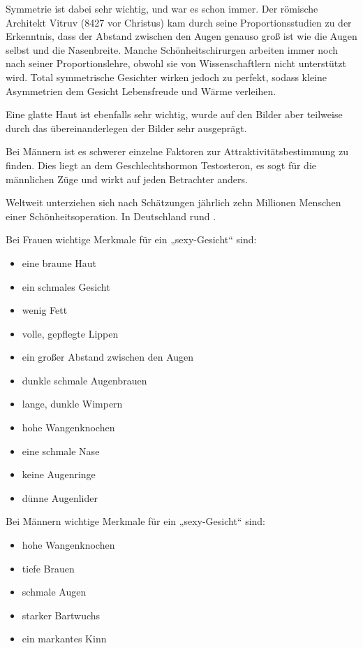 Symmetrie ist dabei sehr wichtig, und war es schon immer. Der römische Architekt Vitruv (8427 vor
Christus) kam durch seine Proportionsstudien zu der Erkenntnis, dass der Abstand zwischen den Augen
genauso groß ist wie die Augen selbst und die Nasenbreite.
Manche Schönheitschirurgen arbeiten immer noch nach seiner Proportionslehre, obwohl sie von
Wissenschaftlern nicht unterstützt wird. Total symmetrische Gesichter wirken jedoch zu perfekt,
sodass kleine Asymmetrien dem Gesicht Lebensfreude und Wärme verleihen.

Eine glatte Haut ist ebenfalls sehr wichtig, wurde auf den Bilder aber teilweise durch das
übereinanderlegen der Bilder sehr ausgeprägt.

Bei Männern ist es schwerer einzelne Faktoren zur Attraktivitätsbestimmung zu finden.
Dies liegt an dem Geschlechtshormon Testosteron, es sogt für die männlichen Züge und wirkt auf jeden
Betrachter anders.

Weltweit unterziehen sich nach Schätzungen jährlich zehn Millionen Menschen einer
Schönheitsoperation. In Deutschland rund .

\newpage
Bei Frauen wichtige Merkmale für ein „sexy-Gesicht“ sind:
\begin{multicols}{2}
\begin{itemize}
	\item eine braune Haut
	\item ein schmales Gesicht
	\item wenig Fett
	\item volle, gepflegte Lippen
	\item ein großer Abstand zwischen den Augen
	\item dunkle schmale Augenbrauen
	\item lange, dunkle Wimpern
	\item hohe Wangenknochen
	\item eine schmale Nase
	\item keine Augenringe
	\item dünne Augenlider
\end{itemize}
\end{multicols}

Bei Männern wichtige Merkmale für ein „sexy-Gesicht“ sind:
\begin{multicols}{2}
\begin{itemize}
	\item hohe Wangenknochen
	\item tiefe Brauen
	\item schmale Augen
	\item starker Bartwuchs
	\item ein markantes Kinn
\end{itemize}
\end{multicols}


